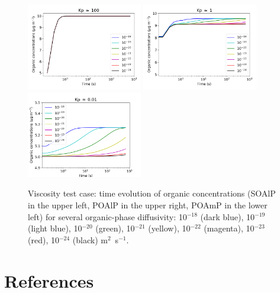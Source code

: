\documentclass[a4paper,11pt]{article}
\begin{document}
\begin{figure}[H]
        \begin{center}
                \includegraphics[angle=0,width=0.45\textwidth]{../graph/figure_ref/visco_soalp.png}
                \includegraphics[angle=0,width=0.45\textwidth]{../graph/figure_ref/visco_poalp.png}
                \includegraphics[angle=0,width=0.45\textwidth]{../graph/figure_ref/visco_poamp.png}
        \end{center}
\caption{Viscosity test case: time evolution of organic concentrations (SOAlP
  in the upper left, POAlP in the upper right, POAmP in the lower left) for
  several organic-phase diffusivity: 10$^{-18}$ (dark blue), 10$^{-19}$ (light
  blue), 10$^{-20}$ (green), 10$^{-21}$ (yellow),
10$^{-22}$ (magenta), 10$^{-23}$ (red), 10$^{-24}$ (black) m$^2$~s$^{-1}$.}
\label{fig-visco}
\end{figure}
       
\bigskip

\section{References}


\end{document}
